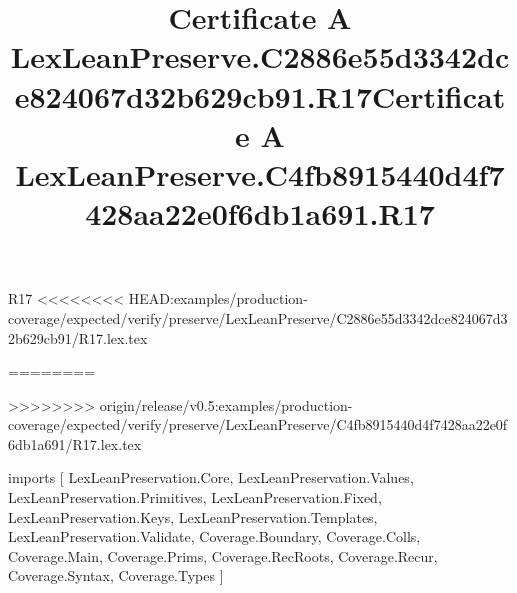 \begin{lexlean}{R17}
<<<<<<<< HEAD:examples/production-coverage/expected/verify/preserve/LexLeanPreserve/C2886e55d3342dce824067d32b629cb91/R17.lex.tex
\title{Certificate A LexLeanPreserve.C2886e55d3342dce824067d32b629cb91.R17}
========
\title{Certificate A LexLeanPreserve.C4fb8915440d4f7428aa22e0f6db1a691.R17}
>>>>>>>> origin/release/v0.5:examples/production-coverage/expected/verify/preserve/LexLeanPreserve/C4fb8915440d4f7428aa22e0f6db1a691/R17.lex.tex
\begin{coremodule}
imports [
  LexLeanPreservation.Core,
  LexLeanPreservation.Values,
  LexLeanPreservation.Primitives,
  LexLeanPreservation.Fixed,
  LexLeanPreservation.Keys,
  LexLeanPreservation.Templates,
  LexLeanPreservation.Validate,
  Coverage.Boundary,
  Coverage.Colls,
  Coverage.Main,
  Coverage.Prims,
  Coverage.RecRoots,
  Coverage.Recur,
  Coverage.Syntax,
  Coverage.Types
]


\end{coremodule}
\end{lexlean}
